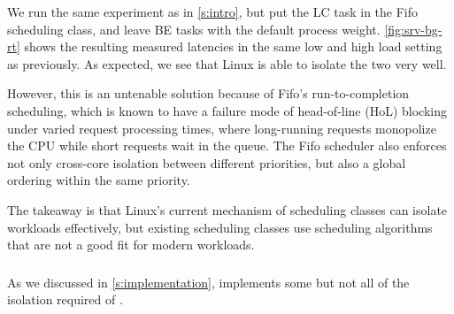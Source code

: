 We run the same experiment as in \autoref{s:intro}, but put the LC task in the
Fifo scheduling class, and leave BE tasks with the default process weight.
\autoref{fig:srv-bg-rt} shows the resulting measured latencies in the same low
and high load setting as previously. As expected, we see that Linux is able to
isolate the two very well. 

However, this is an untenable solution because of Fifo's run-to-completion
scheduling, which is known to have a failure mode of head-of-line (HoL) blocking
under varied request processing times, where long-running requests monopolize
the CPU while short requests wait in the queue. The Fifo scheduler also enforces
not only cross-core isolation between different priorities, but also a global
ordering within the same priority.

The takeaway is that Linux's current mechanism of scheduling classes can isolate
workloads effectively, but existing scheduling classes use scheduling
algorithms that are not a good fit for modern workloads.

\subsubsection{\schedidle}\label{ss:schedidle}

As we discussed in \autoref{s:implementation}, \schedidle{} implements some but
not all of the isolation required of \beclass{}.

